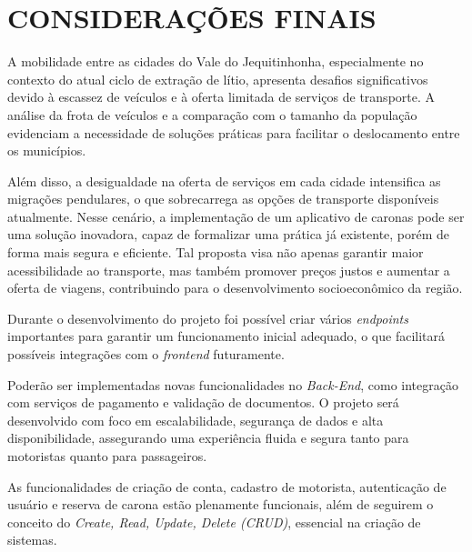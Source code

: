 \chapter{CONSIDERAÇÕES FINAIS}

A mobilidade entre as cidades do Vale do Jequitinhonha, especialmente no contexto do atual ciclo de extração de lítio, apresenta desafios significativos devido à escassez de veículos e à oferta limitada de serviços de transporte. A análise da frota de veículos e a comparação com o tamanho da população evidenciam a necessidade de soluções práticas para facilitar o deslocamento entre os municípios.

Além disso, a desigualdade na oferta de serviços em cada cidade intensifica as migrações pendulares, o que sobrecarrega as opções de transporte disponíveis atualmente. Nesse cenário, a implementação de um aplicativo de caronas pode ser uma solução inovadora, capaz de formalizar uma prática já existente, porém de forma mais segura e eficiente. Tal proposta visa não apenas garantir maior acessibilidade ao transporte, mas também promover preços justos e aumentar a oferta de viagens, contribuindo para o desenvolvimento socioeconômico da região.

Durante o desenvolvimento do projeto foi possível criar vários \textit{endpoints} importantes para garantir um funcionamento inicial adequado, o que facilitará possíveis integrações com o \textit{frontend} futuramente. 

Poderão ser implementadas novas funcionalidades no \textit{Back-End}, como integração com serviços de pagamento e validação de documentos. O projeto será desenvolvido com foco em escalabilidade, segurança de dados e alta disponibilidade, assegurando uma experiência fluida e segura tanto para motoristas quanto para passageiros.

As funcionalidades de criação de conta, cadastro de motorista, autenticação de usuário e reserva de carona estão plenamente funcionais, além de seguirem o conceito do \textit{Create, Read, Update, Delete (CRUD)}, essencial na criação de sistemas. 
